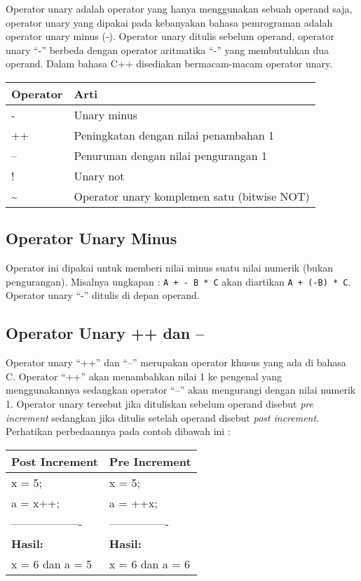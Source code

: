 Operator unary adalah operator yang hanya menggunakan sebuah operand
saja, operator unary yang dipakai pada kebanyakan bahasa pemrograman
adalah operator unary minus (-). Operator unary ditulis sebelum operand,
operator unary ``-'' berbeda dengan operator aritmatika ``-'' yang
membutuhkan dua operand. Dalam bahasa C++ disediakan bermacam-macam
operator unary.

\begin{longtable}[]{@{}ll@{}}
\toprule
Operator & Arti\tabularnewline
\midrule
\endhead
- & Unary minus\tabularnewline
++ & Peningkatan dengan nilai penambahan 1\tabularnewline
-- & Penurunan dengan nilai pengurangan 1\tabularnewline
! & Unary not\tabularnewline
\textasciitilde{} & Operator unary komplemen satu (bitwise
NOT)\tabularnewline
\bottomrule
\end{longtable}

\subsection{Operator Unary Minus}\label{b-operator-unary-minus}

Operator ini dipakai untuk memberi nilai minus suatu nilai numerik
(bukan pengurangan). Misalnya ungkapan : \texttt{A\ +\ -\ B\ *\ C} akan
diartikan \texttt{A\ +\ (-B)\ *\ C}. Operator unary ``-'' ditulis di
depan operand.

\subsection{Operator Unary ++ dan --}\label{c-operator-unary-dan}

Operator unary ``++'' dan ``--'' merupakan operator khusus yang ada di
bahasa C. Operator ``++'' akan menambahkan nilai 1 ke pengenal yang
menggunakannya sedangkan operator ``--'' akan mengurangi dengan nilai
numerik 1. Operator unary tersebut jika dituliskan sebelum operand
disebut \emph{pre increment} sedangkan jika ditulis setelah operand
disebut \emph{post increment}. Perhatikan perbedaannya pada contoh
dibawah ini :

\begin{longtable}[]{@{}ll@{}}
\toprule
Post Increment & Pre Increment\tabularnewline
\midrule
\endhead
x = 5; & x = 5;\tabularnewline
a = x++; & a = ++x;\tabularnewline
------------------- & ----------------\tabularnewline
\textbf{Hasil:} & \textbf{Hasil:}\tabularnewline
x = 6 dan a = 5 & x = 6 dan a = 6\tabularnewline
\bottomrule
\end{longtable}

